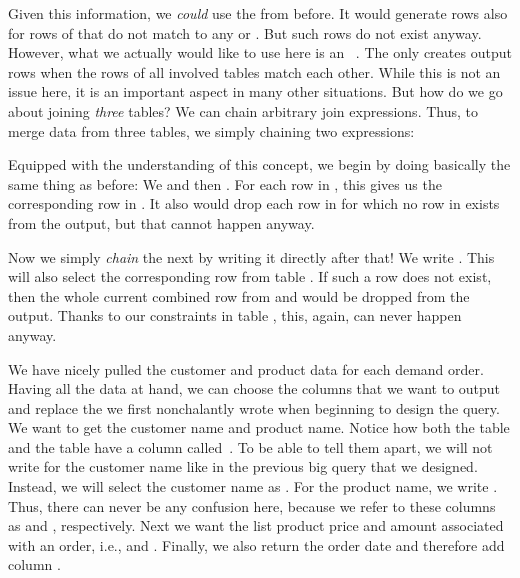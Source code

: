 Given this information, we \emph{could} use the  from before.
It would generate rows also for rows of  that do not match to any  or .
But such rows do not exist anyway.
However, what we actually would like to use here is an ~\cite{PGDG:PD:JT}.
The  only creates output rows when the rows of all involved tables match each other.
While this is not an issue here, it is an important aspect in many other situations.%
%
%
%
But how do we go about joining \emph{three} tables?
We can chain arbitrary join expressions.
Thus, to merge data from three tables, we simply chaining two  expressions:%
%
%
%
%
%
%
\begin{sloppypar}%
Equipped with the understanding of this concept, we begin by doing basically the same thing as before:
We  and then .
For each row in , this gives us the corresponding row in .
It also would drop each row in  for which no row in  exists from the output, but that cannot happen anyway.%
\end{sloppypar}%
%
\begin{sloppypar}%
Now we simply \emph{chain} the next  by writing it directly after that!
We write .
This will also select the corresponding row from table .
If such a row does not exist, then the whole current combined row from  and  would be dropped from the output.
Thanks to our  constraints in table , this, again, can never happen anyway.%
\end{sloppypar}%
%
We have nicely pulled the customer and product data for each demand order.
Having all the data at hand, we can choose the columns that we want to output and replace the  we first nonchalantly wrote when beginning to design the query.
We want to get the customer name and product name.
Notice how both the table  and the table  have a column called~.
To be able to tell them apart, we will not write  for the customer name like in the previous big query that we designed.
Instead, we will select the customer name as .
For the product name, we write .
Thus, there can never be any confusion here, because we refer to these columns as  and , respectively.
Next we want the list product price and amount associated with an order, i.e.,  and .
Finally, we also return the order date and therefore add column .

